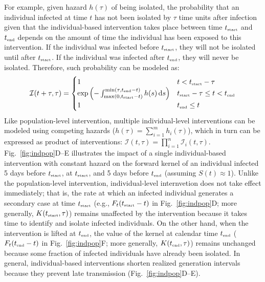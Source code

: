 \documentclass[12pt]{article}
\newcommand{\fref}[1]{Fig.~\ref{fig:#1}}
\newcommand{\tsub}[2]{#1_{{\textrm{\tiny #2}}}}
\newcommand{\dd}[1]{\ensuremath{\, \mathrm{d}#1}}
\newcommand{\tstart}{\ensuremath{\tsub{t}{start}}\xspace}
\newcommand{\tend}{\ensuremath{\tsub{t}{end}}\xspace}
\newcommand{\II}{{\mathcal I}}
\begin{document}
For example, given hazard $h(\tau)$ of being isolated, the probability that an individual infected at time $t$ has not been isolated by $\tau$ time units after infection given that the individual-based intervention takes place between time \tstart and \tend depends on the amount of time the individual has been exposed to this intervention.
If the individual was infected before $\tstart$, they will not be isolated until after $\tstart$.
If the individual was infected after $\tend$, they will never be isolated.
Therefore, such probability can be modeled as:
\begin{equation}
\II(t+\tau, \tau) = \begin{cases}
1 & t < \tstart-\tau \\
\exp\left(- \int_{\max(0, \tstart - t)}^{\min(\tau, \tend-t)} h(s)\dd{s} \right) & \tstart-\tau \leq t < \tend \\
1 & \tend \leq t
\end{cases}
\end{equation}
Like population-level intervention, multiple individual-level interventions can be modeled using competing hazards ($h(\tau)=\sum_{i=1}^m h_i(\tau)$), which in turn can be expressed as product of interventions: $\II(t,\tau) = \prod_{i=1}^n \II_i(t,\tau)$.
\fref{indpop}D--E illustrates the impact of a single individual-based intervention with constant hazard on the forward kernel of an individual infected 5 days before $\tstart$, at $\tstart$, and 5 days before $\tend$ (assuming $S(t) \approx 1$).
Unlike the population-level intervention, individual-level internvetion does not take effect immediately;
that is, the rate at which an infected individual generates a secondary case at time $\tstart$ (e.g., $F_t(\tstart-t)$ in \fref{indpop}D; more generally, $K(\tstart, \tau)$) remains unaffected by the intervention because it takes time to identify and isolate infected individuals.
On the other hand, when the intervention is lifted at $\tend$, the value of the kernel at calendar time $\tend$ ($F_t(\tend-t)$ in \fref{indpop}F; more generally, $K(\tend, \tau)$) remains unchanged because some fraction of infected individuals have already been isolated.
In general, individual-based interventions shorten realized generation intervals because they prevent late transmission (\fref{indpop}D--E).
\end{document}
